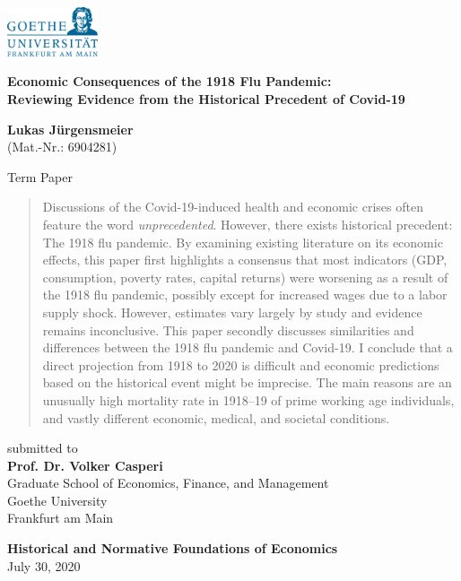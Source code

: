 \documentclass[12pt,a4paper]{article}
\begin{document}
\begin{center}
 \includegraphics[width=0.2\textwidth]{external/GU-Logo-blau-CMYK.eps} \vspace{1.5cm}
  
{\large{\bf Economic Consequences of the 1918 Flu Pandemic:\\
		Reviewing Evidence from the Historical Precedent of Covid-19}}

\textbf{Lukas J\"urgensmeier} \\
{\footnotesize (Mat.-Nr.: 6904281)}

  Term Paper \\\vspace{1.5cm}
  
  \begin{abstract}
  	Discussions of the Covid-19-induced health and economic crises often feature the word \textit{unprecedented}.
  	However, there exists historical precedent: The 1918 flu pandemic.
  	By examining existing literature on its economic effects, this paper first highlights a consensus that most indicators (GDP, consumption, poverty rates, capital returns) were worsening as a result of the 1918 flu pandemic, possibly except for increased wages due to a labor supply shock.
  	However, estimates vary largely by study and evidence remains inconclusive.
  	This paper secondly discusses similarities and differences between the 1918 flu pandemic and Covid-19.
  	I conclude that a direct projection from 1918 to 2020 is difficult and economic predictions based on the historical event might be imprecise.
  	The main reasons are an unusually high mortality rate in 1918--19 of prime working age individuals, and vastly different economic, medical, and societal conditions.
  	
  \end{abstract} \vspace{1.5cm}
  
  submitted to \\\vspace{0.5cm}
  \textbf{Prof. Dr. Volker Casperi} \\
  Graduate School of Economics, Finance, and Management \\
  Goethe University \\
  Frankfurt am Main \vspace{1.5cm}
  
  \textbf{Historical and Normative Foundations of Economics} \\\vspace{0.5cm}
  July 30, 2020
  
\end{center}
\end{document}
